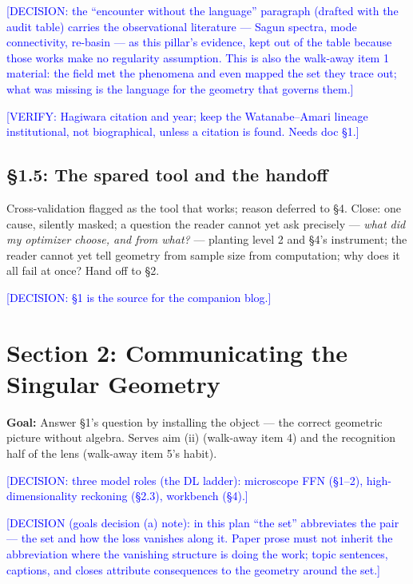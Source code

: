 \documentclass[11pt]{article}
\newcommand{\tagg}[1]{\textcolor{blue}{[#1]}}
\begin{document}
\tagg{DECISION: the ``encounter without the language'' paragraph
(drafted with the audit table) carries the observational literature ---
Sagun spectra, mode connectivity, re-basin --- as this pillar's
evidence, kept out of the table because those works make no regularity
assumption. This is also the walk-away item 1 material: the field met
the phenomena and even mapped the set they trace out; what was missing
is the language for the geometry that governs them.}

\tagg{VERIFY: Hagiwara citation and year; keep the Watanabe--Amari
lineage institutional, not biographical, unless a citation is found.
Needs doc \S1.}

\subsection*{\S1.5: The spared tool and the handoff}

Cross-validation flagged as the tool that works; reason deferred to \S4.
Close: one cause, silently masked; a question the reader cannot yet ask
precisely --- \emph{what did my optimizer choose, and from what?} ---
planting level 2 and \S4's instrument; the reader cannot yet tell
geometry from sample size from computation; why does it all fail at
once? Hand off to \S2.

\tagg{DECISION: \S1 is the source for the companion blog.}

\section{Section 2: Communicating the Singular Geometry}

\textbf{Goal:} Answer \S1's question by installing the object --- the
correct geometric picture without algebra. Serves aim (ii) (walk-away
item 4) and the recognition half of the lens (walk-away item 5's habit).

\tagg{DECISION: three model roles (the DL ladder): microscope FFN
(\S1--2), high-dimensionality reckoning (\S2.3), workbench (\S4).}

\tagg{DECISION (goals decision (a) note): in this plan ``the set''
abbreviates the pair --- the set and how the loss vanishes along it.
Paper prose must not inherit the abbreviation where the vanishing
structure is doing the work; topic sentences, captions, and closes
attribute consequences to the geometry around the set.}
\end{document}
